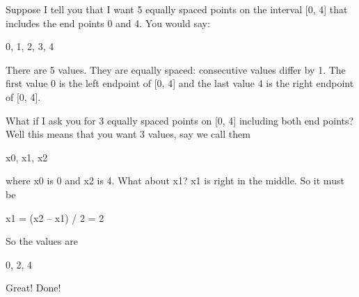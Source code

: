 Suppose I tell you that I want 5 equally spaced points on the interval [0, 4] that includes the end points 0 and 4. You would say:
\begin{center}
0, 1, 2, 3, 4
\end{center}
There are 5 values. They are equally spaced: consecutive values differ
by 1. The first value 0 is the left endpoint of [0, 4] and the last
value 4 is the right endpoint of [0, 4].

What if I ask you for 3 equally spaced points on [0, 4] including
both end points? Well this means that you want 3 values, say we call
them
\begin{center}
x0, x1, x2
\end{center}
where x0 is 0 and x2 is 4. What about x1? x1 is right in the middle. So
it must be
\begin{center}
x1 = (x2 -- x1) / 2 = 2
\end{center}
So the values are
\begin{center}
0, 2, 4
\end{center}
Great! Done!

